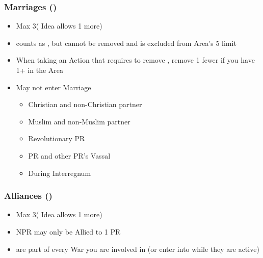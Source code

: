 \documentclass[10pt]{article}
\begin{document}
\subsubsection*{Marriages (\marriage) }
\begin{itemize}
	\item Max 3\marriages ( Idea allows 1 more)
	\item \marriage counts as \influence, but cannot be removed and is excluded from Area's 5 \influence limit
	\item When taking an Action that requires to remove \influence, remove 1 fewer \influence if you have 1+ \marriages in the Area
	\item May not enter Marriage
	\begin{itemize}
		\item Christian and non-Christian partner
		\item Muslim and non-Muslim partner
		\item Revolutionary PR
		\item PR and other PR's Vassal
		\item During Interregnum
	\end{itemize}
\end{itemize}

\subsubsection*{Alliances (\ally) }
\begin{itemize}
	\item Max 3\alliances ( Idea allows 1 more)
	\item NPR may only be Allied to 1 PR
	\item \activeallies are part of every War you are involved in (or enter into while they are active)
\end{itemize}
\end{document}
